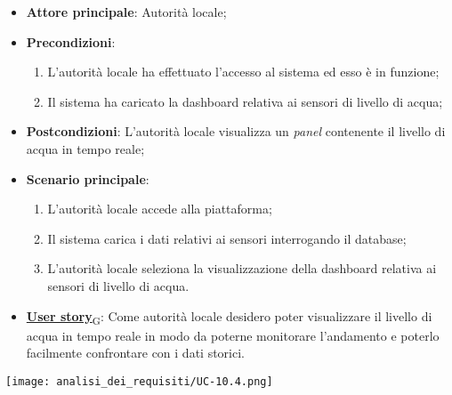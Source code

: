 \begin{itemize}
	\item \textbf{Attore principale}: Autorità locale;
	\item \textbf{Precondizioni}:
	      \begin{enumerate}
		      \item L'autorità locale ha effettuato l'accesso al sistema ed esso è in funzione;
		      \item Il sistema ha caricato la dashboard relativa ai sensori di livello di acqua;
	      \end{enumerate}
	\item \textbf{Postcondizioni}: L'autorità locale visualizza un \textit{panel} contenente il livello di acqua in tempo reale;
	\item \textbf{Scenario principale}:
	      \begin{enumerate}
		      \item L'autorità locale accede alla piattaforma;
		      \item Il sistema carica i dati relativi ai sensori interrogando il database;
		      \item L'autorità locale seleziona la visualizzazione della dashboard relativa ai sensori di livello di acqua.
	      \end{enumerate}
	\item \href{https://7last.github.io/docs/rtb/documentazione-interna/glossario\#user-story}{\textbf{User story}\textsubscript{G}}:
	      Come autorità locale desidero poter visualizzare il livello di acqua in tempo reale in modo da poterne monitorare l'andamento
	      e poterlo facilmente confrontare con i dati storici.
\end{itemize}
\begin{center}
	\texttt{[image: analisi\_dei\_requisiti/UC-10.4.png]}
\end{center}


